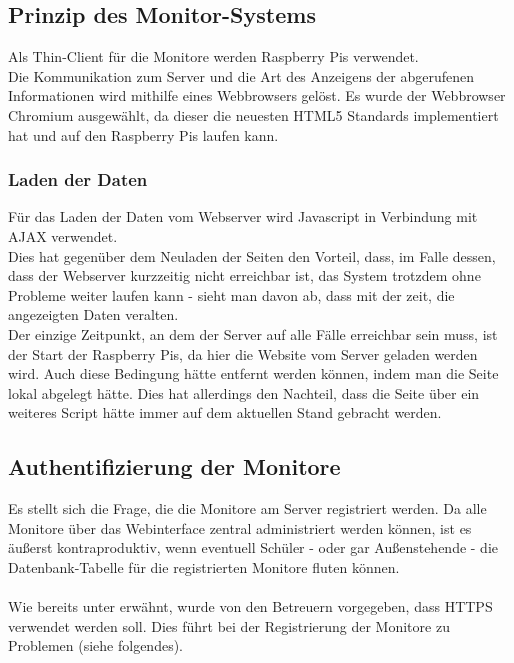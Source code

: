 \subsection{Prinzip des Monitor-Systems}

Als Thin-Client für die Monitore werden Raspberry Pis verwendet.\\
Die Kommunikation zum Server und die Art des Anzeigens der abgerufenen Informationen wird mithilfe eines Webbrowsers gelöst. Es wurde der Webbrowser Chromium ausgewählt, da dieser die neuesten HTML5 Standards implementiert hat und auf den Raspberry Pis laufen kann.

\subsubsection{Laden der Daten}

Für das Laden der Daten vom Webserver wird Javascript in Verbindung mit AJAX verwendet.\\
Dies hat gegenüber dem Neuladen der Seiten den Vorteil, dass, im Falle dessen, dass der Webserver kurzzeitig nicht erreichbar ist, das System trotzdem ohne Probleme weiter laufen kann - sieht man davon ab, dass mit der zeit, die angezeigten Daten veralten.\\
Der einzige Zeitpunkt, an dem der Server auf alle Fälle erreichbar sein muss, ist der Start der Raspberry Pis, da hier die Website vom Server geladen werden wird. Auch diese Bedingung hätte entfernt werden können, indem man die Seite lokal abgelegt hätte. Dies hat allerdings den Nachteil, dass die Seite über ein weiteres Script hätte immer auf dem aktuellen Stand gebracht werden.

\subsection{Authentifizierung der Monitore}

Es stellt sich die Frage, die die Monitore am Server registriert werden. Da alle Monitore über das Webinterface zentral administriert werden können, ist es äußerst kontraproduktiv, wenn eventuell Schüler - oder gar Außenstehende - die Datenbank-Tabelle für die registrierten Monitore fluten können.\\
\\
Wie bereits unter  erwähnt, wurde von den Betreuern vorgegeben, dass HTTPS verwendet werden soll. Dies führt bei der Registrierung der Monitore zu Problemen (siehe folgendes).

